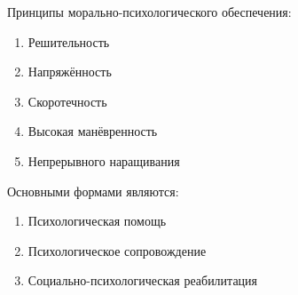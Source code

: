 \documentclass[a4paper,12pt]{article}
\begin{document}
	Принципы морально-психологического обеспечения:
\begin{enumerate}
	\item Решительность
	\item Напряжённость
	\item Скоротечность
	\item Высокая манёвренность
	\item Непрерывного наращивания
\end{enumerate}
	
	Основными формами являются:
\begin{enumerate}
\item Психологическая помощь
\item Психологическое сопровождение
\item Социально-психологическая реабилитация
\end{enumerate}
\end{document}
